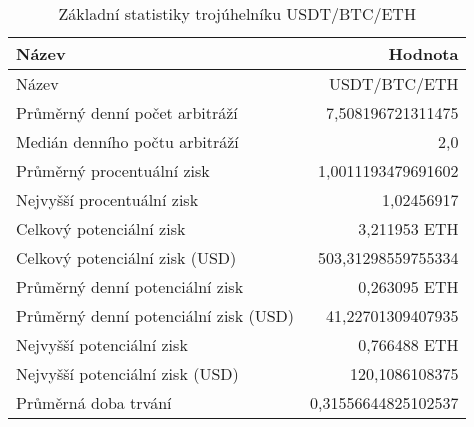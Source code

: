 \begin{table}\centering
\caption{Základní statistiky trojúhelníku USDT/BTC/ETH}
\label{USDTBTCETH_stats}
\begin{tabular}{|| l | r ||}
\hline Název & Hodnota \\ 
\hline\hline Název & USDT/BTC/ETH \\ 
\hline Průměrný denní počet arbitráží & 7,508196721311475 \\ 
\hline Medián denního počtu arbitráží & 2,0 \\ 
\hline Průměrný procentuální zisk & 1,0011193479691602 \\ 
\hline Nejvyšší procentuální zisk & 1,02456917 \\ 
\hline Celkový potenciální zisk & 3,211953 ETH \\ 
\hline Celkový potenciální zisk (USD) & 503,31298559755334 \\ 
\hline Průměrný denní potenciální zisk & 0,263095 ETH \\ 
\hline Průměrný denní potenciální zisk (USD) & 41,22701309407935 \\ 
\hline Nejvyšší potenciální zisk & 0,766488 ETH \\ 
\hline Nejvyšší potenciální zisk (USD) & 120,1086108375 \\ 
\hline Průměrná doba trvání & 0,31556644825102537 \\ 
\hline
\end{tabular}
\end{table}